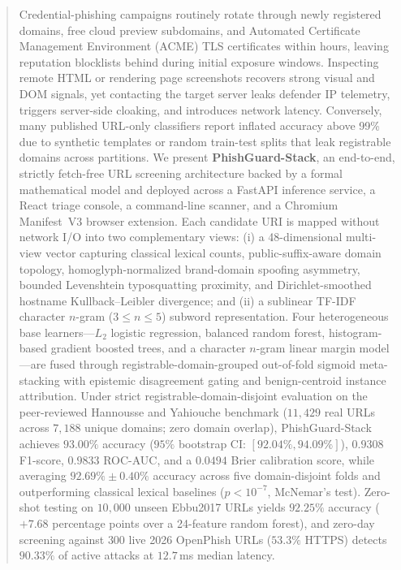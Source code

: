 \documentclass[conference]{IEEEtran}
\begin{document}
\begin{abstract}
Credential-phishing campaigns routinely rotate through newly registered domains, free cloud preview subdomains, and Automated Certificate Management Environment (ACME) TLS certificates within hours, leaving reputation blocklists behind during initial exposure windows. Inspecting remote HTML or rendering page screenshots recovers strong visual and DOM signals, yet contacting the target server leaks defender IP telemetry, triggers server-side cloaking, and introduces network latency. Conversely, many published URL-only classifiers report inflated accuracy above 99\% due to synthetic templates or random train-test splits that leak registrable domains across partitions. We present \textbf{PhishGuard-Stack}, an end-to-end, strictly fetch-free URL screening architecture backed by a formal mathematical model and deployed across a FastAPI inference service, a React triage console, a command-line scanner, and a Chromium Manifest~V3 browser extension. Each candidate URI is mapped without network I/O into two complementary views: (i) a 48-dimensional multi-view vector capturing classical lexical counts, public-suffix-aware domain topology, homoglyph-normalized brand-domain spoofing asymmetry, bounded Levenshtein typosquatting proximity, and Dirichlet-smoothed hostname Kullback--Leibler divergence; and (ii) a sublinear TF-IDF character $n$-gram ($3 \le n \le 5$) subword representation. Four heterogeneous base learners---$L_2$ logistic regression, balanced random forest, histogram-based gradient boosted trees, and a character $n$-gram linear margin model---are fused through registrable-domain-grouped out-of-fold sigmoid meta-stacking with epistemic disagreement gating and benign-centroid instance attribution. Under strict registrable-domain-disjoint evaluation on the peer-reviewed Hannousse and Yahiouche benchmark ($11{,}429$ real URLs across $7{,}188$ unique domains; zero domain overlap), PhishGuard-Stack achieves $93.00\%$ accuracy ($95\%$ bootstrap CI: $[92.04\%, 94.09\%]$), $0.9308$ F1-score, $0.9833$ ROC-AUC, and a $0.0494$ Brier calibration score, while averaging $92.69\% \pm 0.40\%$ accuracy across five domain-disjoint folds and outperforming classical lexical baselines ($p < 10^{-7}$, McNemar's test). Zero-shot testing on $10{,}000$ unseen Ebbu2017 URLs yields $92.25\%$ accuracy ($+7.68$ percentage points over a 24-feature random forest), and zero-day screening against $300$ live 2026 OpenPhish URLs ($53.3\%$ HTTPS) detects $90.33\%$ of active attacks at $12.7$\,ms median latency.
\end{abstract}
\end{document}

